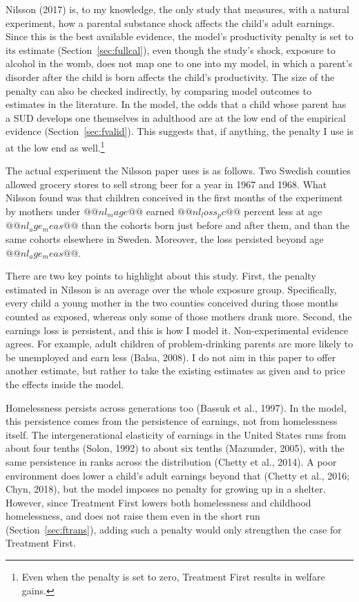 \documentclass[10pt]{article}
\begin{document}
Nilsson (2017) is, to my knowledge, the only study that measures, with a natural experiment, how a parental substance shock affects the child's adult earnings. Since this is the best available evidence, the model's productivity penalty is set to its estimate (Section~\ref{sec:fullcal}), even though the study's shock, exposure to alcohol in the womb, does not map one to one into my model, in which a parent's disorder after the child is born affects the child's productivity.   The size of the penalty can also be checked indirectly, by comparing model outcomes to estimates in the literature. In the model, the odds that a child whose parent has a SUD develops one themselves in adulthood are at the low end of the empirical evidence (Section~\ref{sec:fvalid}). This suggests that, if anything, the penalty I use is at the low end as well.\footnote{ Even when the penalty is set to zero, Treatment First results in welfare gains.}

  The actual experiment the Nilsson paper uses is as follows. Two Swedish counties allowed grocery stores to sell strong beer for a year in 1967 and 1968. What Nilsson found was that children conceived in the first months of the experiment by mothers under $@@nl_mage@@$ earned $@@nl_loss_pc@@$ percent less at age $@@nl_age_meas@@$ than the cohorts born just before and after them, and than the same cohorts elsewhere in Sweden. Moreover, the loss persisted beyond age $@@nl_age_meas@@$.

 There are two key points to highlight about this study. First, the penalty estimated in Nilsson is an average over the whole exposure group. Specifically, every child a young mother in the two counties conceived during those months counted as exposed, whereas only some of those mothers drank more. Second, the earnings loss is persistent, and this is how I model it. Non-experimental evidence agrees. For example, adult children of problem-drinking parents are more likely to be unemployed and earn less (Balsa, 2008). I do not aim in this paper to offer another estimate, but rather to take the existing estimates as given and to price the effects inside the model.

Homelessness persists across generations too (Bassuk et al., 1997). In the model, this persistence comes from the persistence of earnings, not from homelessness itself. The intergenerational elasticity of earnings in the United States runs from about four tenths (Solon, 1992) to about six tenths (Mazumder, 2005), with the same persistence in ranks across the distribution (Chetty et al., 2014). A poor environment does lower a child's adult earnings beyond that (Chetty et al., 2016; Chyn, 2018), but the model imposes no penalty for growing up in a shelter. However, since Treatment First lowers both homelessness and childhood homelessness, and does not raise them even in the short run (Section~\ref{sec:ftrans}), adding such a penalty would only strengthen the case for Treatment First.
\end{document}
